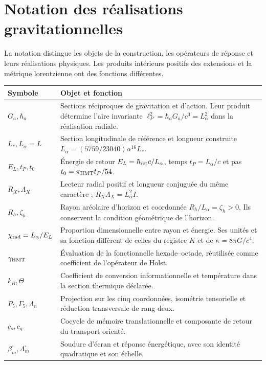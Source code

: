 \begingroup\fontsize{9.3}{10.7}\selectfont\setlength{\parskip}{1pt}
\section{Notation des réalisations gravitationnelles}
La notation distingue les objets de la construction, les opérateurs
de réponse et leurs réalisations physiques. Les produits intérieurs positifs
des extensions et la métrique lorentzienne ont des fonctions différentes.
\renewcommand{\arraystretch}{1.0}\begin{longtable}{@{}p{.23\linewidth}p{.72\linewidth}@{}}
\toprule
Symbole & Objet et fonction\\ \midrule
\endhead
\(G_a,\hbar_a\) & Sections réciproques de gravitation et d'action.
Leur produit détermine l'aire invariante
\(\ell_P^2=\hbar_aG_a/c^3=L_\alpha^2\) dans la réalisation radiale.\\
\(L_*,L_\alpha=L\) & Section longitudinale de référence et longueur construite \(L_\alpha=(5759/23040)\alpha^{16}L_*\).\\
\(E_L,t_P,t_0\) & Énergie de retour \(E_L=\hbar_{\rm ret}c/L_\alpha\), temps \(t_P=L_\alpha/c\) et pas \(t_0=\pi_{\rm HMT}t_P/54\).\\
\(R_X,\Lambda_X\) & Lecteur radial positif et longueur conjuguée du
même caractère ; \(R_X\Lambda_X=L_\alpha^2I\).\\
\(R_h,\zeta_h\) & Rayon aréolaire d'horizon et coordonnée \(R_h/L_\alpha=\zeta_h>0\). Ils conservent la condition géométrique de l'horizon.\\
\(\chi_{\rm rad}=L_\alpha/E_L\) & Proportion dimensionnelle entre rayon
et énergie. Ses unités et sa fonction diffèrent de celles du registre \(K\)
et de \(\kappa=8\pi G/c^4\).\\
\(\gamma_{\rm HMT}\) & Évaluation de la fonctionnelle hexade--octade,
réutilisée comme coefficient de l'opérateur de Holst.\\
\(k_B,\Theta\) & Coefficient de conversion informationnelle et température dans la section thermique déclarée.\\
\(P_5,\Gamma_5,\Lambda_n\) & Projection sur les cinq coordonnées,
isométrie tensorielle et réduction transversale de rang deux.\\
\(c_s,c_g\) & Cocycle de mémoire translationnelle et composante de retour du transport orienté.\\
\(\beta_m^\square,\Lambda_m^\square\) & Soudure d'écran et
réponse énergétique, avec son identité quadratique et son échelle.\\

\end{longtable}
